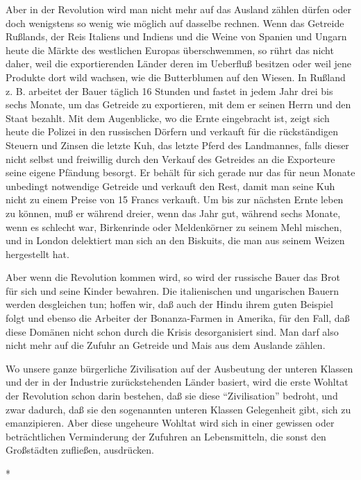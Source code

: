 \documentclass{scrbook}
\begin{document}
Aber in der Revolution wird man nicht mehr auf das Ausland zählen dürfen oder doch wenigstens so wenig wie möglich auf dasselbe rechnen. Wenn das Getreide Rußlands, der Reis Italiens und Indiens und die Weine von Spanien und Ungarn heute die Märkte des westlichen Europas überschwemmen, so rührt das nicht daher, weil die exportierenden Länder deren im Ueberfluß besitzen oder weil jene Produkte dort wild wachsen, wie die Butterblumen auf den Wiesen. In Rußland z. B. arbeitet der Bauer täglich 16 Stunden und fastet in jedem Jahr drei bis sechs Monate, um das Getreide zu exportieren, mit dem er seinen Herrn und den Staat bezahlt. Mit dem Augenblicke, wo die Ernte eingebracht ist, zeigt sich heute die Polizei in den russischen Dörfern und verkauft für die rückständigen Steuern und Zinsen die letzte Kuh, das letzte Pferd des Landmannes, falls dieser nicht selbst und freiwillig durch den Verkauf des Getreides an die Exporteure seine eigene Pfändung besorgt. Er behält für sich gerade nur das für neun Monate unbedingt notwendige Getreide und verkauft den Rest, damit man seine Kuh nicht zu einem Preise von 15 Francs verkauft. Um bis zur nächsten Ernte leben zu können, muß er während dreier, wenn das Jahr gut, während sechs Monate, wenn es schlecht war, Birkenrinde oder Meldenkörner zu seinem Mehl mischen, und in London delektiert man sich an den Biskuits, die man aus seinem Weizen hergestellt hat.

Aber wenn die Revolution kommen wird, so wird der russische Bauer das Brot für sich und seine Kinder bewahren. Die italienischen und ungarischen Bauern werden desgleichen tun; hoffen wir, daß auch der Hindu ihrem guten Beispiel folgt und ebenso die Arbeiter der Bonanza-Farmen in Amerika, für den Fall, daß diese Domänen nicht schon durch die Krisis desorganisiert sind. Man darf also nicht mehr auf die Zufuhr an Getreide und Mais aus dem Auslande zählen.

Wo unsere ganze bürgerliche Zivilisation auf der Ausbeutung der unteren Klassen und der in der Industrie zurückstehenden Länder basiert, wird die erste Wohltat der Revolution schon darin bestehen, daß sie diese ``Zivilisation'' bedroht, und zwar dadurch, daß sie den sogenannten unteren Klassen Gelegenheit gibt, sich zu emanzipieren. Aber diese ungeheure Wohltat wird sich in einer gewissen oder beträchtlichen Verminderung der Zufuhren an Lebensmitteln, die sonst den Großstädten zufließen, ausdrücken.

\begin{center}*\end{center}
\end{document}
